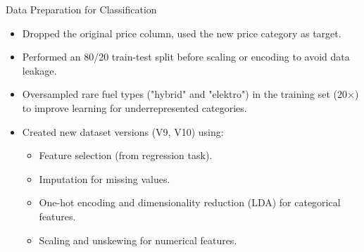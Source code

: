 \documentclass{beamer}
\begin{document}
\begin{frame}{Data Preparation for Classification}
        \begin{itemize}
                \item Dropped the original price column, used the new price
                        category as target.
                \item Performed an 80/20 train-test split before scaling or
                        encoding to avoid data leakage.
                \item Oversampled rare fuel types ("hybrid" and "elektro") in
                        the training set (20$\times$) to improve learning for
                        underrepresented categories.
                \item Created new dataset versions (V9, V10) using:
                        \begin{itemize}
                                \item Feature selection (from regression task).
                                \item Imputation for missing values.
                                \item One-hot encoding and dimensionality
                                        reduction (LDA) for categorical
                                        features.
                                \item Scaling and unskewing for numerical
                                        features.
                        \end{itemize}
        \end{itemize}
\end{frame}
\end{document}
